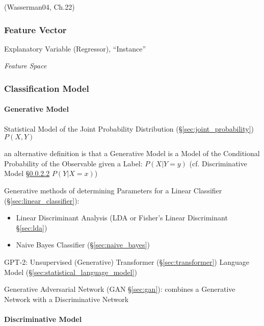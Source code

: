 (Wasserman04, Ch.22)



\subsubsection{Feature Vector}\label{sec:feature_vector}

Explanatory Variable (Regressor), ``Instance''

\emph{Feature Space}



\subsubsection{Classification Model}\label{sec:classification_model}

\paragraph{Generative Model}\label{sec:generative_model}\hfill

Statistical Model of the Joint Probability Distribution
(\S\ref{sec:joint_probability}) $P(X,Y)$

an alternative definition is that a Generative Model is a Model of the
Conditional Probability of the Observable given a Label: $P(X|Y = y)$
(cf. Discriminative Model \S\ref{sec:discriminative_model} $P(Y|X = x)$)

Generative methods of determining Parameters for a Linear Classifier
(\S\ref{sec:linear_classifier}):
\begin{itemize}
  \item Linear Discriminant Analysis (LDA or Fisher's Linear Discriminant
    \S\ref{sec:lda})
  \item Naive Bayes Classifier (\S\ref{sec:naive_bayes})
\end{itemize}

GPT-2: Unsupervised (Generative) Transformer (\S\ref{sec:transformer}) Language
Model (\S\ref{sec:statistical_language_model})

\fist Generative Adversarial Network (GAN \S\ref{sec:gan}): combines a
Generative Network with a Discriminative Network



\paragraph{Discriminative Model}\label{sec:discriminative_model}\hfill

